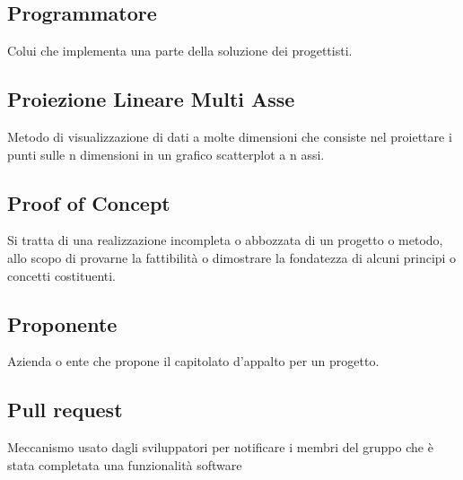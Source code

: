 \documentclass[../glossario.tex]{subfiles}
\begin{document}
\subsection*{Programmatore} 
Colui che implementa una parte della soluzione dei progettisti.

\subsection*{Proiezione Lineare Multi Asse}
Metodo di visualizzazione di dati a molte dimensioni che consiste nel proiettare i punti sulle n dimensioni in un grafico scatterplot a n assi. 

\subsection*{Proof of Concept} 
Si tratta di una realizzazione incompleta o abbozzata di un progetto o metodo, allo scopo di provarne la fattibilità o dimostrare la fondatezza di alcuni principi o concetti costituenti.

\subsection*{Proponente} 
Azienda o ente che propone il capitolato d'appalto per un progetto.

\subsection*{Pull request} 
Meccanismo usato dagli sviluppatori per notificare i membri del gruppo che è stata completata una funzionalità software



    
\end{document}
